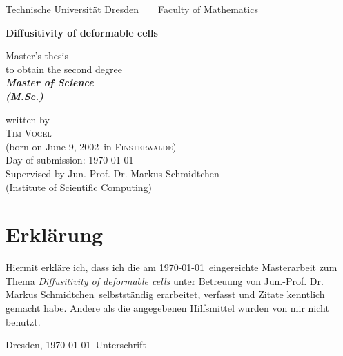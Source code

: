 \documentclass[a4paper,12pt,leqno]{report}
\newcommand{\name}{Vogel}
\newcommand{\vorname}{Tim}
\newcommand{\gebdatum}{June 9, 2002}
\newcommand{\ort}{Finsterwalde}
\newcommand{\betreuer}{Jun.-Prof. Dr. Markus Schmidtchen}
\newcommand{\institut}{Institute of Scientific Computing}
\newcommand{\thema}{Diffusitivity of deformable cells}
\newcommand{\datum}{\today} %
\begin{document}

\thispagestyle{empty}

\begin{center}
{\Large Technische Universit\"{a}t Dresden\  \ \textbullet\ \ Faculty of Mathematics}

\vfil

{\bfseries\Huge\thema}

\vfil
{\LARGE
Master's thesis \\[\bigskipamount]
to obtain the second degree \\[\bigskipamount]
\bfseries{\itshape Master of Science\\
\textup{(}M.Sc.\textup{)}}\\[\bigskipamount]
}



\vfil\vfil

\vfil

written by
\\[\bigskipamount]
\textsc{\vorname} \textsc{\name}
\\[\bigskipamount]
(born on \gebdatum\ in \textsc{\ort})
\\[\bigskipamount]
Day of submission: \datum
\\[\bigskipamount]
Supervised by \betreuer\  \\ (\institut)
\end{center}



\cleardoublepage


\chapter*{Erkl\"{a}rung}
\thispagestyle{empty}
Hiermit erkl\"{a}re ich, dass ich die am \datum\ eingereichte Masterarbeit zum Thema
\emph{\thema} unter Betreuung von \betreuer\ selbstst\"{a}ndig erarbeitet,
verfasst und Zitate kenntlich gemacht habe. Andere als die angegebenen Hilfsmittel
wurden von mir nicht benutzt.

\bigskip \bigskip \bigskip \bigskip \bigskip

Dresden, \datum\ \hfill Unterschrift

\normalsize
\end{document}
